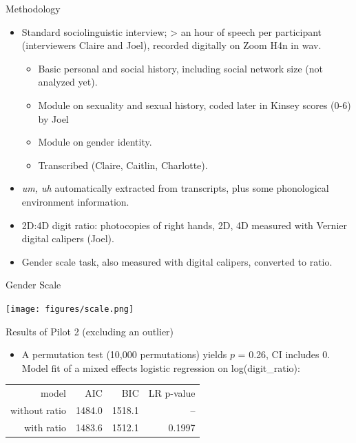 \documentclass[hyperref={pdfpagelabels=false}]{beamer}
\begin{document}
\begin{frame}{Methodology}
\begin{itemize}
	\item Standard sociolinguistic interview; > an hour of speech per participant (interviewers Claire and Joel), recorded digitally on Zoom H4n in wav.
		\begin{itemize}
			\item Basic personal and social history, including social network size (not analyzed yet).
			\item Module on sexuality and sexual history, coded later in Kinsey scores (0-6) by Joel
			\item Module on gender identity.
			\item Transcribed (Claire, Caitlin, Charlotte).
		\end{itemize}
	\item \textsl{um, uh} automatically extracted from transcripts, plus some phonological environment information.
	\item 2D:4D digit ratio: photocopies of right hands, 2D, 4D measured with Vernier digital calipers (Joel).
	\item Gender scale task, also measured with digital calipers, converted to ratio.
\end{itemize}
\end{frame}

\begin{frame}{Gender Scale}
\begin{center}
	\texttt{[image: figures/scale.png]}
\end{center}
\end{frame}




\begin{frame}{Results of Pilot 2 (excluding an outlier)}
\begin{itemize}
\item A permutation test (10,000 permutations) yields $p$ = 0.26, CI includes 0. Model fit of a mixed effects logistic regression on log(digit\_ratio):
\end{itemize}
\begin{center}
\begin{tabular}{rrrr}
\toprule
	model & AIC & BIC & LR p-value\\
	\cmidrule{2-4}
without ratio & 1484.0 & 1518.1 & -- \\
with ratio &  1483.6 & 1512.1 & 0.1997\\
\bottomrule
\end{tabular}
\end{center}

\end{frame}
\end{document}
